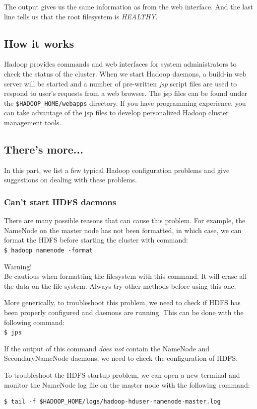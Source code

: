 The output gives us the same information as from the web interface. And the last line tells us that the root filesystem is \emph{HEALTHY}.
\subsection*{How it works}
Hadoop provides commands and web interfaces for system administrators to check the status of the cluster. When we start Hadoop daemons, a build-in web server will be started and a number of pre-written \emph{jsp} script files are used to respond to user's requests from a web browser. The jsp files can be found under the \verb|$HADOOP_HOME/webapps| directory. If you have programming experience, you can take advantage of the jsp files to develop personalized Hadoop cluster management tools.

\subsection*{There's more...}
In this part, we list a few typical Hadoop configuration problems and give suggestions on dealing with these problems.

\subsubsection*{Can't start HDFS daemons}
There are many possible reasons that can cause this problem. For example, the NameNode on the master node has not been formatted, in which case, we can format the HDFS before starting the cluster with command: \\
\verb|$ hadoop namenode -format|
\begin{warning}
Warning! \\
Be cautious when formatting the filesystem with this command. It will erase all the data on the file system. Always try other methods before using this one.
\end{warning}

More generically, to troubleshoot this problem, we need to check if HDFS has been properly configured and daemons are running. This can be done with the following command: \\
\verb|$ jps|

If the output of this command \emph{does not} contain the NameNode and SecondaryNameNode daemons, we need to check the configuration of HDFS.

To troubleshoot the HDFS startup problem, we can open a new terminal and monitor the NameNode log file on the master node with the following command:
\lstset{style=bashstyle}
\begin{lstlisting}
$ tail -f $HADOOP_HOME/logs/hadoop-hduser-namenode-master.log
\end{lstlisting}

